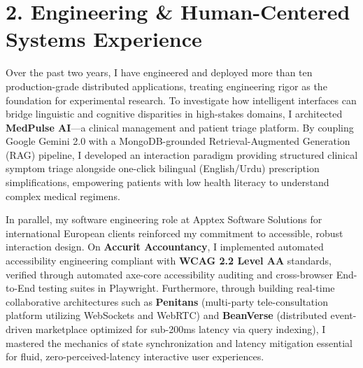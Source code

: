 \documentclass[10pt,a4paper]{article}
\begin{document}
\section{2. Engineering \& Human-Centered Systems Experience}
Over the past two years, I have engineered and deployed more than ten production-grade distributed applications, treating engineering rigor as the foundation for experimental research. To investigate how intelligent interfaces can bridge linguistic and cognitive disparities in high-stakes domains, I architected \textbf{MedPulse AI}---a clinical management and patient triage platform. By coupling Google Gemini 2.0 with a MongoDB-grounded Retrieval-Augmented Generation (RAG) pipeline, I developed an interaction paradigm providing structured clinical symptom triage alongside one-click bilingual (English/Urdu) prescription simplifications, empowering patients with low health literacy to understand complex medical regimens.

In parallel, my software engineering role at Apptex Software Solutions for international European clients reinforced my commitment to accessible, robust interaction design. On \textbf{Accurit Accountancy}, I implemented automated accessibility engineering compliant with \textbf{WCAG 2.2 Level AA} standards, verified through automated axe-core accessibility auditing and cross-browser End-to-End testing suites in Playwright. Furthermore, through building real-time collaborative architectures such as \textbf{Penitans} (multi-party tele-consultation platform utilizing WebSockets and WebRTC) and \textbf{BeanVerse} (distributed event-driven marketplace optimized for sub-200ms latency via query indexing), I mastered the mechanics of state synchronization and latency mitigation essential for fluid, zero-perceived-latency interactive user experiences.

\end{document}
